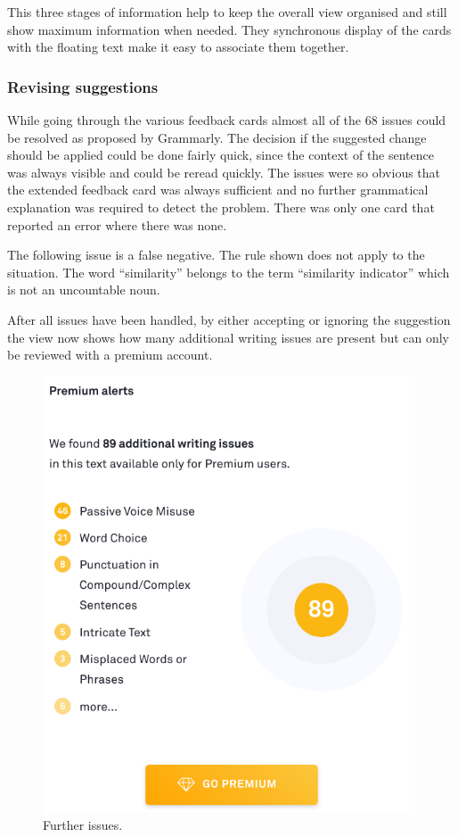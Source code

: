 \documentclass[runningheads]{llncs}
\let\OldTextregistered\textregistered
\renewcommand{\textregistered}{\OldTextregistered\xspace}
\begin{document}
This three stages of information help to keep the overall view organised and still show maximum information when needed. They synchronous display of the cards with the floating text make it easy to associate them together. 

\subsubsection{Revising suggestions}
While going through the various feedback cards almost all of the 68 issues could be resolved as proposed by Grammarly\textregistered. The decision if the suggested change should be applied could be done fairly quick, since the context of the sentence was always visible and could be reread quickly. The issues were so obvious that the extended feedback card was always sufficient and no further grammatical explanation was required to detect the problem. There was only one card that reported an error where there was none. 

The following issue is a false negative. The rule shown does not apply to the situation. The word ``similarity'' belongs to the term ``similarity indicator'' which is not an uncountable noun.


\noindent{}

After all issues have been handled, by either accepting or ignoring the suggestion the view now shows how many additional writing issues are present but can only be reviewed with a premium account.

\begin{figure}[H]
  \includegraphics[width=0.8\linewidth]{images/premium.png}
  \caption{Further issues.}
  \label{fig:premium}
\end{figure}
\end{document}
